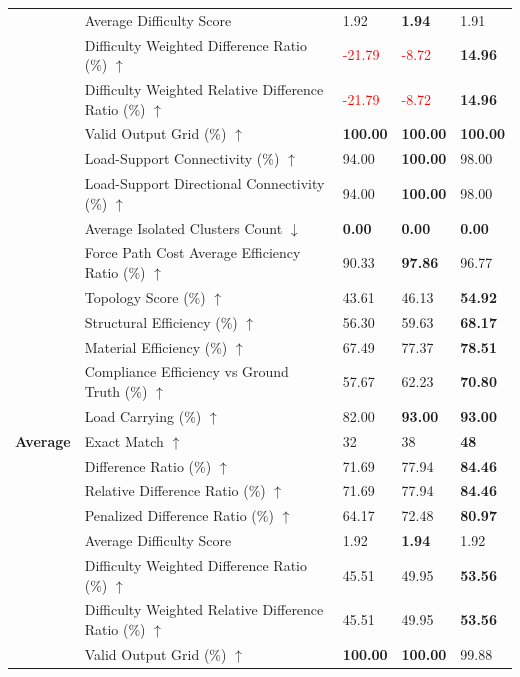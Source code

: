\begin{table}[!h]
{\begin{tabular}{lllll}
 & Average Difficulty Score & 1.92 & \textbf{1.94} & 1.91 \\
 & Difficulty Weighted Difference Ratio (\%) $\uparrow$ & \textcolor{red}{-21.79} & \textcolor{red}{-8.72} & \textbf{14.96} \\
 & Difficulty Weighted Relative Difference Ratio (\%) $\uparrow$ & \textcolor{red}{-21.79} & \textcolor{red}{-8.72} & \textbf{14.96} \\
 & Valid Output Grid (\%) $\uparrow$ & \textbf{100.00} & \textbf{100.00} & \textbf{100.00} \\
 & Load-Support Connectivity (\%) $\uparrow$ & 94.00 & \textbf{100.00} & 98.00 \\
 & Load-Support Directional Connectivity (\%) $\uparrow$ & 94.00 & \textbf{100.00} & 98.00 \\
 & Average Isolated Clusters Count $\downarrow$ & \textbf{0.00} & \textbf{0.00} & \textbf{0.00} \\
 & Force Path Cost Average Efficiency Ratio (\%) $\uparrow$ & 90.33 & \textbf{97.86} & 96.77 \\
 & Topology Score (\%) $\uparrow$ & 43.61 & 46.13 & \textbf{54.92} \\
 & Structural Efficiency (\%) $\uparrow$ & 56.30 & 59.63 & \textbf{68.17} \\
 & Material Efficiency (\%) $\uparrow$ & 67.49 & 77.37 & \textbf{78.51} \\
 & Compliance Efficiency vs Ground Truth (\%) $\uparrow$ & 57.67 & 62.23 & \textbf{70.80} \\
 & Load Carrying (\%) $\uparrow$ & 82.00 & \textbf{93.00} & \textbf{93.00} \\
\midrule
\textbf{Average} & Exact Match $\uparrow$ & 32 & 38 & \textbf{48} \\
 & Difference Ratio (\%) $\uparrow$ & 71.69 & 77.94 & \textbf{84.46} \\
 & Relative Difference Ratio (\%) $\uparrow$ & 71.69 & 77.94 & \textbf{84.46} \\
 & Penalized Difference Ratio (\%) $\uparrow$ & 64.17 & 72.48 & \textbf{80.97} \\
 & Average Difficulty Score & 1.92 & \textbf{1.94} & 1.92 \\
 & Difficulty Weighted Difference Ratio (\%) $\uparrow$ & 45.51 & 49.95 & \textbf{53.56} \\
 & Difficulty Weighted Relative Difference Ratio (\%) $\uparrow$ & 45.51 & 49.95 & \textbf{53.56} \\
 & Valid Output Grid (\%) $\uparrow$ & \textbf{100.00} & \textbf{100.00} & 99.88 \\

\end{tabular}}
\end{table}
